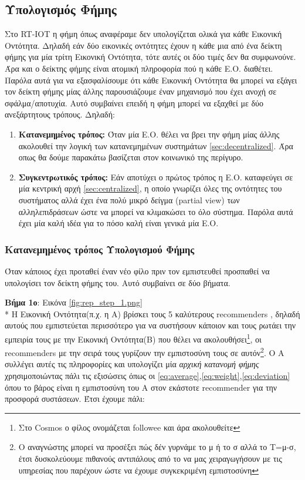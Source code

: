 \subsection{Υπολογισμός Φήμης}\label{sec:calculate_rep}
Στο RT-IOT η φήμη όπως αναφέραμε δεν υπολογίζεται ολικά για κάθε Εικονική Οντότητα. Δηλαδή εάν δύο εικονικές οντότητες έχουν η κάθε μια από ένα δείκτη φήμης για μία τρίτη Εικονική Οντότητα, τότε αυτές οι δύο τιμές δεν θα συμφωνούνε. Άρα και ο δείκτης φήμης είναι ατομική πληροφορία πού η κάθε Ε.Ο. διαθέτει. Παρόλα αυτά για να εξασφαλίσουμε ότι κάθε Εικονική Οντότητα θα μπορεί να εξάγει τον δείκτη φήμης μίας άλλης παρουσιάζουμε έναν μηχανισμό που έχει ανοχή σε σφάλμα/αποτυχία. Αυτό συμβαίνει επειδή η φήμη μπορεί να εξαχθεί με δύο ανεξάρτητους τρόπους. Δηλαδή:
\begin{enumerate}
\item \textbf{Κατανεμημένος τρόπος:} Όταν μία Ε.Ο. θέλει να βρει την φήμη μίας άλλης ακολουθεί την λογική των κατανεμημένων συστημάτων \ref{sec:decentralized}. Άρα οπως θα δούμε παρακάτω βασίζεται στον κοινωνικό της περίγυρο.

\item \textbf{Συγκεντρωτικός τρόπος:} Εάν αποτύχει ο πρώτος τρόπος η Ε.Ο. καταφεύγει σε μία κεντρική αρχή \ref{sec:centralized},  η οποίο γνωρίζει όλες της οντότητες του συστήματος αλλά έχει ένα πολύ μικρό δείγμα (partial view) των αλληλεπιδράσεων ώστε να μπορεί να κλιμακώσει το όλο σύστημα. Παρόλα αυτά έχει μία καλή ιδέα για το πόσο καλή είναι γενικά μία Ε.Ο.

\end{enumerate}

\subsubsection{Κατανεμημένος τρόπος Υπολογισμού Φήμης}
Όταν κάποιος έχει προταθεί έναν νέο φίλο πριν τον εμπιστευθεί προσπαθεί να υπολογίσει τον δείκτη φήμης του. Αυτό συμβαίνει σε δύο βήματα.

\textbf{Βήμα 1ο}: Εικόνα \ref{fig:rep_step_1.png} \\*
Η Εικονική Οντότητα(π.χ. η Α) βρίσκει τους 5 καλύτερους recommenders , δηλαδή αυτούς που εμπιστεύεται περισσότερο για να συστήσουν κάποιον και τους ρωτάει την εμπειρία τους με την Εικονική Οντότητα(Β) που θέλει να ακολουθήσει\footnote{Στο Cosmos ο φίλος ονομάζεται followee και άρα ακολουθείτε}, οι recommenders  με την σειρά τους γυρίζουν την εμπιστοσύνη τους σε αυτόν\footnote{Ο αναγνώστης μπορεί να προσέξει πώς δέν γυρνάμε το μ ή το σ αλλά το Τ=μ-σ, έτσι δυσκολεύουμε πιθανούς αντιπάλους από το να μας χειραγωγήσουν με τις υπηρεσίας που παρέχουν ώστε να έχουμε συγκεκριμένη εμπιστοσύνη}. Ο Α συλλέγει αυτές τις πληροφορίες και υπολογίζει μία \textit{ αρχική κατανομή φήμης } χρησιμοποιώντας πάλι τις εξισώσεις όπως οι \ref{eq:average},\ref{eq:weight},\ref{eq:deviation} όπου το βάρος είναι η εμπιστοσύνη του Α στον εκάστοτε recommender για την προσφορά συστάσεων. Έτσι έχουμε πάλι:

